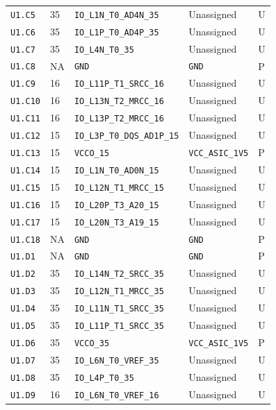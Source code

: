 \documentclass[11pt,a4paper]{article}
\begin{document}
\begin{longtable}{@{}P{20mm}P{10mm}P{70mm}P{51mm}P{11mm}@{}}
\nolinkurl{U1.C5} & 35 & \nolinkurl{IO_L1N_T0_AD4N_35} & Unassigned & U \\
\nolinkurl{U1.C6} & 35 & \nolinkurl{IO_L1P_T0_AD4P_35} & Unassigned & U \\
\nolinkurl{U1.C7} & 35 & \nolinkurl{IO_L4N_T0_35} & Unassigned & U \\
\nolinkurl{U1.C8} & NA & \nolinkurl{GND} & \nolinkurl{GND} & P \\
\nolinkurl{U1.C9} & 16 & \nolinkurl{IO_L11P_T1_SRCC_16} & Unassigned & U \\
\nolinkurl{U1.C10} & 16 & \nolinkurl{IO_L13N_T2_MRCC_16} & Unassigned & U \\
\nolinkurl{U1.C11} & 16 & \nolinkurl{IO_L13P_T2_MRCC_16} & Unassigned & U \\
\nolinkurl{U1.C12} & 15 & \nolinkurl{IO_L3P_T0_DQS_AD1P_15} & Unassigned & U \\
\nolinkurl{U1.C13} & 15 & \nolinkurl{VCCO_15} & \nolinkurl{VCC_ASIC_1V5} & P \\
\nolinkurl{U1.C14} & 15 & \nolinkurl{IO_L1N_T0_AD0N_15} & Unassigned & U \\
\nolinkurl{U1.C15} & 15 & \nolinkurl{IO_L12N_T1_MRCC_15} & Unassigned & U \\
\nolinkurl{U1.C16} & 15 & \nolinkurl{IO_L20P_T3_A20_15} & Unassigned & U \\
\nolinkurl{U1.C17} & 15 & \nolinkurl{IO_L20N_T3_A19_15} & Unassigned & U \\
\nolinkurl{U1.C18} & NA & \nolinkurl{GND} & \nolinkurl{GND} & P \\
\nolinkurl{U1.D1} & NA & \nolinkurl{GND} & \nolinkurl{GND} & P \\
\nolinkurl{U1.D2} & 35 & \nolinkurl{IO_L14N_T2_SRCC_35} & Unassigned & U \\
\nolinkurl{U1.D3} & 35 & \nolinkurl{IO_L12N_T1_MRCC_35} & Unassigned & U \\
\nolinkurl{U1.D4} & 35 & \nolinkurl{IO_L11N_T1_SRCC_35} & Unassigned & U \\
\nolinkurl{U1.D5} & 35 & \nolinkurl{IO_L11P_T1_SRCC_35} & Unassigned & U \\
\nolinkurl{U1.D6} & 35 & \nolinkurl{VCCO_35} & \nolinkurl{VCC_ASIC_1V5} & P \\
\nolinkurl{U1.D7} & 35 & \nolinkurl{IO_L6N_T0_VREF_35} & Unassigned & U \\
\nolinkurl{U1.D8} & 35 & \nolinkurl{IO_L4P_T0_35} & Unassigned & U \\
\nolinkurl{U1.D9} & 16 & \nolinkurl{IO_L6N_T0_VREF_16} & Unassigned & U \\

\end{longtable}
\end{document}
